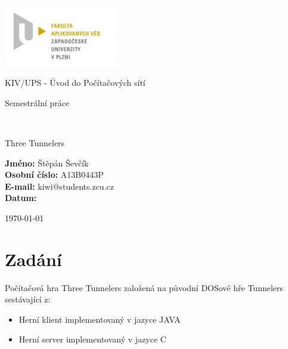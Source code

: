 \documentclass[12pt,a4paper]{article}
\author{Jan Šmejkal}
\let\oldsection\section
\renewcommand\section{\clearpage\oldsection}
\begin{document}
\begin{titlepage}

\includegraphics[width=50mm]{img/FAV.jpg}
\\[160 pt]
\centerline{ \Huge \sc KIV/UPS - Úvod do Počítačových sítí}
\centerline{ \LARGE \sc Semestrální práce }
\\[12 pt]
{\Huge \sc
\centerline{Three Tunnelers}
}


{
\vfill 
\parindent=0cm
\textbf{Jméno:} Štěpán Ševčík\\
\textbf{Osobní číslo:} A13B0443P\\
\textbf{E-mail:} kiwi@students.zcu.cz\\
\textbf{Datum:} {\large \today\par} %

}

\end{titlepage}


\newpage
\setcounter{page}{2}
\setcounter{tocdepth}{3}
\tableofcontents



\section{Zadání}
\noindent
Počítačová hra Three Tunnelers založená na původní DOSové hře Tunnelers sestávající z:
\begin{itemize}
\setlength\itemsep{-1em}
\item Herní klient implementovaný v jazyce JAVA
\item Herní server implementovaný v jazyce C
\end{itemize}
\end{document}
